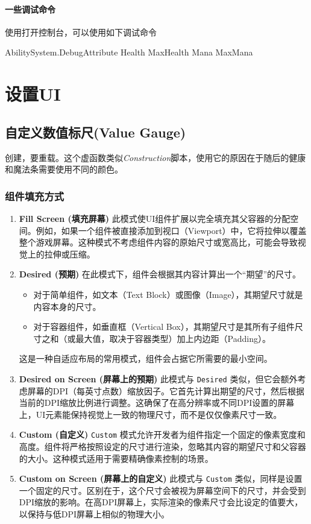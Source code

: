 \subsubsection{一些调试命令}
使用打开控制台，可以使用如下调试命令
\begin{code}
	AbilitySystem.DebugAttribute Health MaxHealth Mana MaxMana
\end{code}


\chapter{设置UI}
\section{自定义数值标尺(Value Gauge)}
创建，要重载。这个虚函数类似\emph{Construction}脚本，使用它的原因在于随后的健康和魔法条需要使用不同的颜色。

\subsection{组件填充方式}
\begin{enumerate}
	\item \textbf{Fill Screen (填充屏幕)}
	此模式使UI组件扩展以完全填充其父容器的分配空间。例如，如果一个组件被直接添加到视口（Viewport）中，它将拉伸以覆盖整个游戏屏幕。这种模式不考虑组件内容的原始尺寸或宽高比，可能会导致视觉上的拉伸或压缩。
	
	\item \textbf{Desired (预期)}
	在此模式下，组件会根据其内容计算出一个“期望”的尺寸。
	\begin{itemize}
		\item 对于简单组件，如文本（Text Block）或图像（Image），其期望尺寸就是内容本身的尺寸。
		\item 对于容器组件，如垂直框（Vertical Box），其期望尺寸是其所有子组件尺寸之和（或最大值，取决于容器类型）加上内边距（Padding）。
	\end{itemize}
	这是一种自适应布局的常用模式，组件会占据它所需要的最小空间。
	
	\item \textbf{Desired on Screen (屏幕上的预期)}
	此模式与 \texttt{Desired} 类似，但它会额外考虑屏幕的DPI（每英寸点数）缩放因子。它首先计算出期望的尺寸，然后根据当前的DPI缩放比例进行调整。这确保了在高分辨率或不同DPI设置的屏幕上，UI元素能保持视觉上一致的物理尺寸，而不是仅仅像素尺寸一致。
	
	\item \textbf{Custom (自定义)}
	\texttt{Custom} 模式允许开发者为组件指定一个固定的像素宽度和高度。组件将严格按照设定的尺寸进行渲染，忽略其内容的期望尺寸和父容器的大小。这种模式适用于需要精确像素控制的场景。
	
	\item \textbf{Custom on Screen (屏幕上的自定义)}
	此模式与 \texttt{Custom} 类似，同样是设置一个固定的尺寸。区别在于，这个尺寸会被视为屏幕空间下的尺寸，并会受到DPI缩放的影响。在高DPI屏幕上，实际渲染的像素尺寸会比设定的值要大，以保持与低DPI屏幕上相似的物理大小。
\end{enumerate}	
